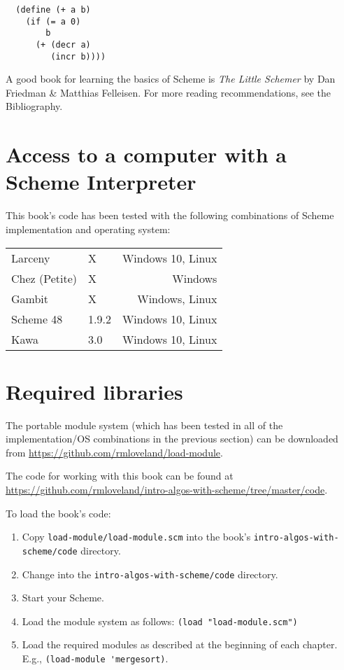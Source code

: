 \documentclass[12pt,openright,draft]{book}
\begin{document}
\begin{verbatim}
  (define (+ a b)
    (if (= a 0)
        b
      (+ (decr a)
         (incr b))))
\end{verbatim}

A good book for learning the basics of Scheme is \emph{The Little
  Schemer} by Dan Friedman \& Matthias Felleisen.  For more
reading recommendations, see the Bibliography. %

\section{Access to a computer with a Scheme Interpreter}

This book's code has been tested with the following combinations of
Scheme implementation and operating system:

\begin{tabular}{ l m r }
Larceny        & X     & Windows 10, Linux \\
Chez (Petite)  & X     & Windows           \\
Gambit         & X     & Windows, Linux    \\
Scheme 48      & 1.9.2 & Windows 10, Linux \\
Kawa           & 3.0   & Windows 10, Linux
\end{tabular}

\section{Required libraries}

The portable module system (which has been tested in all of the
implementation/OS combinations in the previous section) can be
downloaded from \url{https://github.com/rmloveland/load-module}.

The code for working with this book can be found at
\url{https://github.com/rmloveland/intro-algos-with-scheme/tree/master/code}.

To load the book's code:

\begin{enumerate}

\item Copy \verb|load-module/load-module.scm| into the book's
  \verb|intro-algos-with-scheme/code| directory.

\item Change into the \verb|intro-algos-with-scheme/code| directory.

\item Start your Scheme.

\item Load the module system as follows:
  \verb|(load "load-module.scm")|

\item Load the required modules as described at the beginning of each
  chapter.
  E.g., \verb|(load-module 'mergesort)|.

\end{enumerate}
\end{document}
